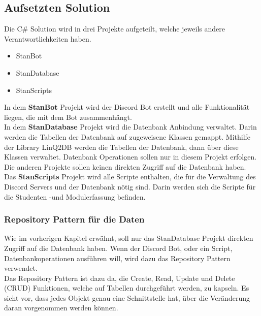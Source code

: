 \documentclass[a4paper, table]{article}
\begin{document}
\subsection{Aufsetzten Solution}
Die C\# Solution wird in drei Projekte aufgeteilt, welche jeweils andere Verantwortlichkeiten haben.
\begin{itemize}
    \item StanBot
    \item StanDatabase
    \item StanScripts
\end{itemize}

In dem \textbf{StanBot} Projekt wird der Discord Bot erstellt und alle Funktionalität liegen,
die mit dem Bot zusammenhängt.\\
In dem \textbf{StanDatabase} Projekt wird die Datenbank Anbindung verwaltet.
Darin werden die Tabellen der Datenbank auf zugeweisene Klassen gemappt.
Mithilfe der Library LinQ2DB werden die Tabellen der Datenbank, dann über diese Klassen verwaltet.
Datenbank Operationen sollen nur in diesem Projekt erfolgen. 
Die anderen Projekte sollen keinen direkten Zugriff auf die Datenbank haben.\\
Das \textbf{StanScripts} Projekt wird alle Scripte enthalten, 
die für die Verwaltung des Discord Servers und der Datenbank nötig sind.
Darin werden sich die Scripte für die Studenten -und Modulerfassung befinden.

\subsubsection{Repository Pattern für die Daten}
Wie im vorherigen Kapitel erwähnt, soll nur das StanDatabase Projekt direkten Zugriff auf die Datenbank haben.
Wenn der Discord Bot, oder ein Script, Datenbankoperationen ausführen will, wird dazu das Repository Pattern verwendet.\\
Das Repository Pattern ist dazu da, die Create, Read, Update und Delete (CRUD) Funktionen, 
welche auf Tabellen durchgeführt werden, zu kapseln. \autocite{gosebrink_aspnet_2014}
Es sieht vor, dass jedes Objekt genau eine Schnittstelle hat, über die Veränderung daran vorgenommen werden können.
\end{document}
